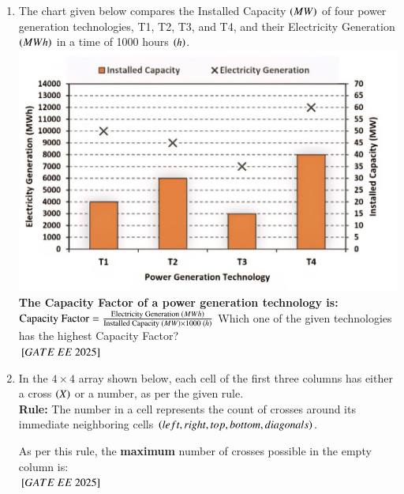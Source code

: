 \documentclass[journal,12pt,onecolumn]{IEEEtran}
\theoremstyle{remark}
\begin{document}
\begin{enumerate}
   \item The chart given below compares the Installed Capacity  $\left(MW\right)$ of four power generation technologies, T1, T2, T3, and T4, and their Electricity Generation  $\left(MWh\right)$ in a time of 1000 hours  $\left(h\right)$.
\includegraphics[scale=0.25]{figs/Q8.jpg}
\textbf{The Capacity Factor of a power generation technology is:}
$
\text{Capacity Factor} = \frac{\text{Electricity Generation  $\left(MWh\right)$}}{\text{Installed Capacity  $\left(MW\right)$} \times 1000 \text{  $\left(h\right)$}}
$
 Which one of the given technologies has the highest Capacity Factor? \\    
\hfill ${}\left[GATE\ EE\ 2025\right]$
\begin{enumerate}
    \end{enumerate}

   \item In the $4 \times 4$ array shown below, each cell of the first three columns has either a cross  $\left(X\right)$ or a number, as per the given rule. \\

\textbf{Rule:} The number in a cell represents the count of crosses around its immediate neighboring cells $\left(left, right, top, bottom, diagonals\right)$.

 

As per this rule, the \textbf{maximum} number of crosses possible in the empty column is:
 \\    
\hfill ${}\left[GATE\ EE\ 2025\right]$
    \begin{enumerate}
    \end{enumerate}


\end{enumerate}
\end{document}
